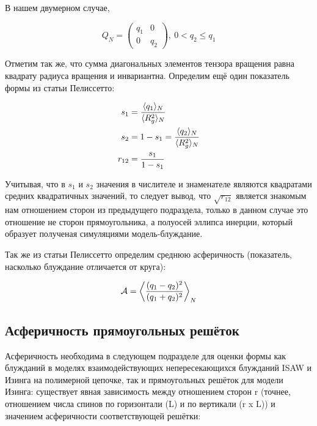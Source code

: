 В нашем двумерном случае, 

\begin{equation*}
    Q_{N} = \left(
    \begin{array}{cc}
      q_{1} & 0 \\
      0 & q_{2}
    \end{array} \right),\ 0 < q_{2} \leq q_{1}
\end{equation*}

Отметим так же, что сумма диагональных элементов тензора вращения равна квадрату радиуса вращения и инвариантна. Определим ещё один показатель формы из статьи Пелиссетто\cite{Pelissetto}:

\begin{align*}
    s_{1} &= \frac{\langle q_{1} \rangle_{N}}{\langle R_{g}^{2} \rangle_{N}}\\
    s_{2} &= 1 - s_{1} = \frac{\langle q_{2} \rangle_{N}}{\langle R_{g}^{2} \rangle_{N}}\\
    r_{12} &= \frac{s_{1}}{1-s_{1}}
\end{align*}

Учитывая, что в $s_{1}$ и $s_{2}$ значения в числителе и знаменателе являются квадратами средних квадратичных значений, то следует вывод, что $\sqrt{r_{12}}$ является знакомым нам отношением сторон из предыдущего подраздела, только в данном случае это отношение не сторон прямоугольника, а полуосей эллипса инерции, который образует полученая симуляциями модель-блуждание.

Так же из статьи Пелиссетто\cite{Pelissetto} определим среднюю асферичность (показатель, насколько блуждание отличается от круга):

\begin{equation}
\label{eq:Asphericity}
    \mathcal{A} = \left< \frac{(q_{1} - q_{2})^{2}}{(q_{1} + q_{2})^{2}} \right>_{N}
\end{equation}

\subsection{Асферичность прямоугольных решёток}

Асферичность необходима в следующем подразделе для оценки формы как блужданий в моделях взаимодействующих непересекающихся блужданий ISAW и Изинга на полимерной цепочке, так и прямоугольных решёток для модели Изинга: существует явная зависимость между отношением сторон r (точнее, отношением числа спинов по горизонтали (L) и по вертикали (r x L)) и значением асферичности соответствующей решётки:

